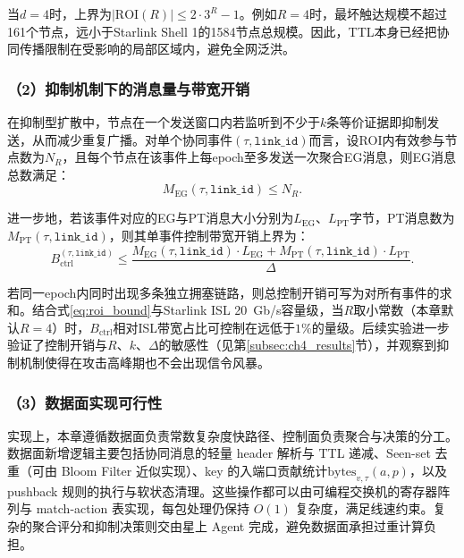 当$d=4$时，上界为$| \text{ROI}(R) | \le 2\cdot 3^R -1$。例如$R=4$时，最坏触达规模不超过161个节点，远小于Starlink Shell 1的1584节点总规模。因此，TTL本身已经把协同传播限制在受影响的局部区域内，避免全网泛洪。

\subsubsection*{（2）抑制机制下的消息量与带宽开销}
在抑制型扩散中，节点在一个发送窗口内若监听到不少于$k$条等价证据即抑制发送，从而减少重复广播。对单个协同事件$(\tau,\texttt{link\_id})$而言，设ROI内有效参与节点数为$N_R$，且每个节点在该事件上每epoch至多发送一次聚合EG消息，则EG消息总数满足：
\begin{equation}
M_{\text{EG}}(\tau,\texttt{link\_id}) \le N_R.
\label{eq:msg_count}
\end{equation}

进一步地，若该事件对应的EG与PT消息大小分别为$L_{\text{EG}}$、$L_{\text{PT}}$字节，PT消息数为$M_{\text{PT}}(\tau,\texttt{link\_id})$，则其单事件控制带宽开销上界为：
\begin{equation}
B_{\text{ctrl}}^{(\tau,\texttt{link\_id})} \le \frac{M_{\text{EG}}(\tau,\texttt{link\_id})\cdot L_{\text{EG}} + M_{\text{PT}}(\tau,\texttt{link\_id})\cdot L_{\text{PT}}}{\Delta}.
\label{eq:ctrl_bw}
\end{equation}

若同一epoch内同时出现多条独立拥塞链路，则总控制开销可写为对所有事件的求和。结合式\eqref{eq:roi_bound}与Starlink ISL 20~Gb/s容量级，当$R$取小常数（本章默认$R=4$）时，$B_{\text{ctrl}}$相对ISL带宽占比可控制在远低于$1\%$的量级。后续实验进一步验证了控制开销与$R、k、\Delta$的敏感性（见第\ref{subsec:ch4_results}节），并观察到抑制机制使得在攻击高峰期也不会出现信令风暴。

\subsubsection*{（3）数据面实现可行性}
实现上，本章遵循数据面负责常数复杂度快路径、控制面负责聚合与决策的分工。数据面新增逻辑主要包括协同消息的轻量 header 解析与 TTL 递减、Seen-set 去重（可由 Bloom Filter 近似实现）、key 的入端口贡献统计$\text{bytes}_{v,\tau}(a,p)$，以及 pushback 规则的执行与软状态清理。这些操作都可以由可编程交换机的寄存器阵列与 match-action 表实现，每包处理仍保持 $O(1)$ 复杂度，满足线速约束。复杂的聚合评分和抑制决策则交由星上 Agent 完成，避免数据面承担过重计算负担。


